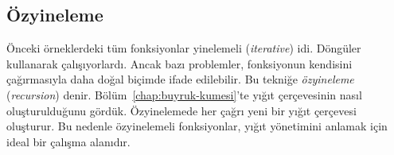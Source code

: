\subsection{Özyineleme}
\label{subsec:ozyineleme}

Önceki örneklerdeki tüm fonksiyonlar yinelemeli (\emph{iterative}) idi. Döngüler kullanarak çalışıyorlardı. Ancak bazı problemler, fonksiyonun kendisini çağırmasıyla daha doğal biçimde ifade edilebilir. Bu tekniğe \emph{özyineleme} (\emph{recursion}) denir. Bölüm~\ref{chap:buyruk-kumesi}'te yığıt çerçevesinin nasıl oluşturulduğunu gördük. Özyinelemede her çağrı yeni bir yığıt çerçevesi oluşturur. Bu nedenle özyinelemeli fonksiyonlar, yığıt yönetimini anlamak için ideal bir çalışma alanıdır.

